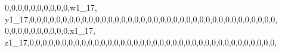 \documentclass[]{article}
\newenvironment{Shaded}{\begin{snugshade}}{\end{snugshade}}
\newcommand{\DecValTok}[1]{\textcolor[rgb]{0.00,0.00,0.81}{#1}}
\newcommand{\NormalTok}[1]{#1}
\begin{document}
\begin{Shaded}
\begin{Highlighting}[]
\DecValTok{0}\NormalTok{,}\DecValTok{0}\NormalTok{,}\DecValTok{0}\NormalTok{,}\DecValTok{0}\NormalTok{,}\DecValTok{0}\NormalTok{,}\DecValTok{0}\NormalTok{,}\DecValTok{0}\NormalTok{,}\DecValTok{0}\NormalTok{,}\DecValTok{0}\NormalTok{,}\DecValTok{0}\NormalTok{,w1_}\DecValTok{17}\NormalTok{, y1_}\DecValTok{17}\NormalTok{,}\DecValTok{0}\NormalTok{,}\DecValTok{0}\NormalTok{,}\DecValTok{0}\NormalTok{,}\DecValTok{0}\NormalTok{,}\DecValTok{0}\NormalTok{,}\DecValTok{0}\NormalTok{,}\DecValTok{0}\NormalTok{,}\DecValTok{0}\NormalTok{,}\DecValTok{0}\NormalTok{,}\DecValTok{0}\NormalTok{,}\DecValTok{0}\NormalTok{,}\DecValTok{0}\NormalTok{,}\DecValTok{0}\NormalTok{,}\DecValTok{0}\NormalTok{,}\DecValTok{0}\NormalTok{,}\DecValTok{0}\NormalTok{,}\DecValTok{0}\NormalTok{,}\DecValTok{0}\NormalTok{,}\DecValTok{0}\NormalTok{,}\DecValTok{0}\NormalTok{,}\DecValTok{0}\NormalTok{,}\DecValTok{0}\NormalTok{,}\DecValTok{0}\NormalTok{,}\DecValTok{0}\NormalTok{,}\DecValTok{0}\NormalTok{,}\DecValTok{0}\NormalTok{,}\DecValTok{0}\NormalTok{,}\DecValTok{0}\NormalTok{,}\DecValTok{0}\NormalTok{,}\DecValTok{0}\NormalTok{,}\DecValTok{0}\NormalTok{,}\DecValTok{0}\NormalTok{,}\DecValTok{0}\NormalTok{,}\DecValTok{0}\NormalTok{,}\DecValTok{0}\NormalTok{,}\DecValTok{0}\NormalTok{,}\DecValTok{0}\NormalTok{,}\DecValTok{0}\NormalTok{,}
\DecValTok{0}\NormalTok{,}\DecValTok{0}\NormalTok{,}\DecValTok{0}\NormalTok{,}\DecValTok{0}\NormalTok{,}\DecValTok{0}\NormalTok{,}\DecValTok{0}\NormalTok{,}\DecValTok{0}\NormalTok{,}\DecValTok{0}\NormalTok{,}\DecValTok{0}\NormalTok{,}\DecValTok{0}\NormalTok{,x1_}\DecValTok{17}\NormalTok{, z1_}\DecValTok{17}\NormalTok{,}\DecValTok{0}\NormalTok{,}\DecValTok{0}\NormalTok{,}\DecValTok{0}\NormalTok{,}\DecValTok{0}\NormalTok{,}\DecValTok{0}\NormalTok{,}\DecValTok{0}\NormalTok{,}\DecValTok{0}\NormalTok{,}\DecValTok{0}\NormalTok{,}\DecValTok{0}\NormalTok{,}\DecValTok{0}\NormalTok{,}\DecValTok{0}\NormalTok{,}\DecValTok{0}\NormalTok{,}\DecValTok{0}\NormalTok{,}\DecValTok{0}\NormalTok{,}\DecValTok{0}\NormalTok{,}\DecValTok{0}\NormalTok{,}\DecValTok{0}\NormalTok{,}\DecValTok{0}\NormalTok{,}\DecValTok{0}\NormalTok{,}\DecValTok{0}\NormalTok{,}\DecValTok{0}\NormalTok{,}\DecValTok{0}\NormalTok{,}\DecValTok{0}\NormalTok{,}\DecValTok{0}\NormalTok{,}\DecValTok{0}\NormalTok{,}\DecValTok{0}\NormalTok{,}\DecValTok{0}\NormalTok{,}\DecValTok{0}\NormalTok{,}\DecValTok{0}\NormalTok{,}\DecValTok{0}\NormalTok{,}\DecValTok{0}\NormalTok{,}\DecValTok{0}\NormalTok{,}\DecValTok{0}\NormalTok{,}\DecValTok{0}\NormalTok{,}\DecValTok{0}\NormalTok{,}\DecValTok{0}\NormalTok{,}\DecValTok{0}\NormalTok{,}\DecValTok{0}\NormalTok{,}

\end{Highlighting}
\end{Shaded}
\end{document}
